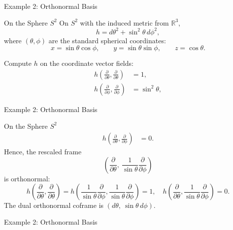 \begin{frame}{Example 2: Orthonormal Basis}
\vspace{-0.2cm}
\begin{block}{On the Sphere \(S^2\)}
On $S^2$ with the induced metric from $\mathbb{R}^3$,
\vspace{-0.2cm}
\[
h=d\theta^2+\sin^2\theta\,d\phi^2,
\]
where $(\theta,\phi)$ are the standard spherical coordinates:
\vspace{-0.2cm}
\[
x=\sin\theta\cos\phi,\qquad
y=\sin\theta\sin\phi,\qquad
z=\cos\theta.
\]

Compute $h$ on the coordinate vector fields:
\vspace{-0.2cm}
\[
\begin{aligned}
h\!\left(\frac{\partial}{\partial\theta},\frac{\partial}{\partial\theta}\right)
&=1,\\[2pt]
h\!\left(\frac{\partial}{\partial\phi},\frac{\partial}{\partial\phi}\right)
&=\sin^2\theta,
\end{aligned}
\]
\end{block}
\end{frame}

\begin{frame}{Example 2: Orthonormal Basis}
\begin{block}{On the Sphere \(S^2\)}
\[
\begin{aligned}
h\!\left(\frac{\partial}{\partial\theta},\frac{\partial}{\partial\phi}\right)
&=0.
\end{aligned}
\]
Hence, the rescaled frame
\[
\left(\frac{\partial}{\partial\theta},\ \frac{1}{\sin\theta}\frac{\partial}{\partial\phi}\right)
\]
is orthonormal:
\[
h\!\left(\frac{\partial}{\partial\theta},\frac{\partial}{\partial\theta}\right)
=h\!\left(\frac{1}{\sin\theta}\frac{\partial}{\partial\phi},\frac{1}{\sin\theta}\frac{\partial}{\partial\phi}\right)=1,
\quad
h\!\left(\frac{\partial}{\partial\theta},\frac{1}{\sin\theta}\frac{\partial}{\partial\phi}\right)=0.
\]
The dual orthonormal coframe is $(d\theta,\ \sin\theta\,d\phi)$.
\end{block}

\end{frame}

\begin{frame}{Example 2: Orthonormal Basis}
\begin{center}
\end{center}
\end{frame}




